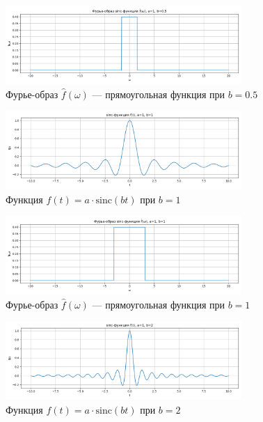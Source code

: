 \begin{figure}[H]
    \centering
    \includegraphics[width=0.8\textwidth]{python/sinc_fourier_b0.5.png}
    \caption{Фурье-образ $\hat{f}(\omega)$ — прямоугольная функция при $b = 0.5$}
\end{figure}

\begin{figure}[H]
    \centering
    \includegraphics[width=0.8\textwidth]{python/sinc_function_b1.png}
    \caption{Функция $f(t) = a \cdot \mathrm{sinc}(bt)$ при $b = 1$}
\end{figure}

\begin{figure}[H]
    \centering
    \includegraphics[width=0.8\textwidth]{python/sinc_fourier_b1.png}
    \caption{Фурье-образ $\hat{f}(\omega)$ — прямоугольная функция при $b = 1$}
\end{figure}

\begin{figure}[H]
    \centering
    \includegraphics[width=0.8\textwidth]{python/sinc_function_b2.png}
    \caption{Функция $f(t) = a \cdot \mathrm{sinc}(bt)$ при $b = 2$}
\end{figure}

